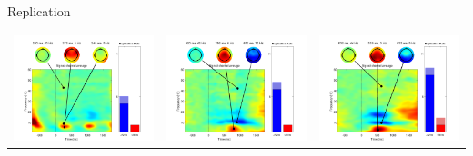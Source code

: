 \documentclass[final]{beamer}
\begin{document}
\begin{frame}{}
\begin{textblock}{70}
\begin{block}{Replication}
\begin{tabular}{c c c}
\includegraphics{gamma07} & \includegraphics{gamma08} & \includegraphics{gamma09} \\

\end{tabular}
\end{block}
\end{textblock}
\end{frame}
\end{document}
